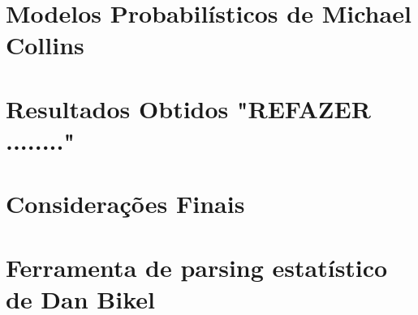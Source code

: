 \documentclass[a4paper]{abnt}
\begin{document}
\chapter{Modelos Probabilísticos de Michael Collins}
\label{cha:michael_collins}
	

%	

%	

\chapter{Resultados Obtidos "REFAZER ........"}
\label{cha:resultados_parciais}
	

\chapter{Considerações Finais}
\label{cha:consuderacoes_finais}
	

\appendix

\chapter{Ferramenta de parsing estatístico de Dan Bikel}
\label{cha:dan_bikel1}
	


%	

%

\renewcommand{\bibname}{Referência Bibliografia}

\end{document}
